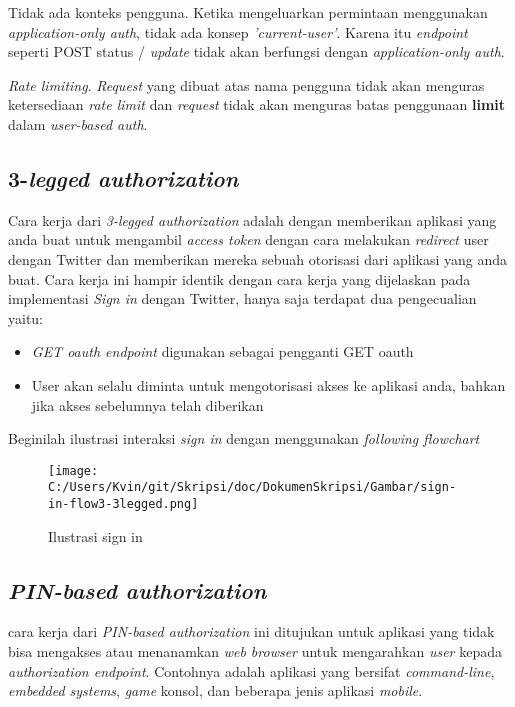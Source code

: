 Tidak ada konteks pengguna. Ketika mengeluarkan permintaan menggunakan \textit{application-only auth}, tidak ada konsep \textit{'current-user'}. Karena itu \textit{endpoint} seperti POST status / \textit{update} tidak akan berfungsi dengan \textit{application-only auth}.

\textit{Rate limiting}. \textit{Request} yang dibuat atas nama pengguna tidak akan menguras ketersediaan \textit{rate limit} dan \textit{request} tidak akan menguras batas penggunaan \textbf{limit} dalam \textit{user-based auth}.


\subsection{3-\textit{legged authorization}}
Cara kerja dari \textit{3-legged authorization} adalah dengan memberikan aplikasi yang anda buat untuk mengambil \textit{access token} dengan cara melakukan \textit{redirect} user dengan Twitter dan memberikan mereka sebuah otorisasi dari aplikasi yang anda buat. Cara kerja ini hampir identik dengan cara kerja yang dijelaskan pada implementasi \textit{Sign in} dengan Twitter, hanya saja terdapat dua pengecualian yaitu:

\begin{itemize}
	\item \textit{GET oauth endpoint} digunakan sebagai pengganti GET oauth
	\item User akan selalu diminta untuk mengotorisasi akses ke aplikasi anda, bahkan jika akses sebelumnya telah diberikan
\end{itemize}

Beginilah ilustrasi interaksi \textit{sign in} dengan menggunakan \textit{following flowchart}

\begin{figure}[H]
	\centering
		\texttt{[image: C:/Users/Kvin/git/Skripsi/doc/DokumenSkripsi/Gambar/sign-in-flow3-3legged.png]}
	\caption{Ilustrasi sign in}
	\label{fig:sign-in-flow3-3legged}
\end{figure}

\subsection{\textit{PIN-based authorization}}
cara kerja dari \textit{PIN-based authorization} ini ditujukan untuk aplikasi yang tidak bisa mengakses atau menanamkan \textit{web browser} untuk mengarahkan \textit{user} kepada \textit{authorization endpoint}. Contohnya adalah aplikasi yang bersifat \textit{command-line}, \textit{embedded systems}, \textit{game} konsol, dan beberapa jenis aplikasi \textit{mobile}.


